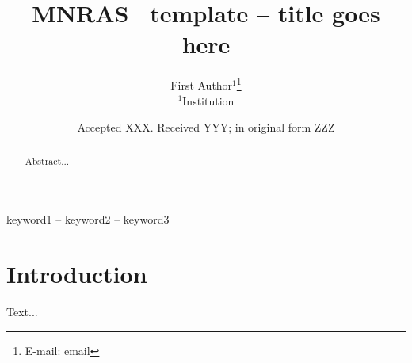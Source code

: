 \documentclass[fleqn,usenatbib]{mnras}
\title[Short title, max. 45 characters]{MNRAS \LaTeXe\ template -- title goes here}
\author[authors running]{
First Author$^{1}$\thanks{E-mail: email}
\\
$^{1}$Institution
}
\date{Accepted XXX. Received YYY; in original form ZZZ}
\begin{document}
\label{firstpage}
\pagerange{\pageref{firstpage}--\pageref{lastpage}}
\maketitle

\begin{abstract}
Abstract...
\end{abstract}

\begin{keywords}
keyword1 -- keyword2 -- keyword3
\end{keywords}

\section{Introduction}

Text...




\bsp    %
\label{lastpage}
\end{document}
